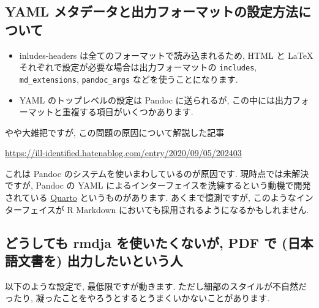 \documentclass[
]{ltjsarticle}
\providecommand{\tightlist}{%
  \setlength{\itemsep}{0pt}\setlength{\parskip}{0pt}}
\begin{document}
\hypertarget{yaml-ux30e1ux30bfux30c7ux30fcux30bfux3068ux51faux529bux30d5ux30a9ux30fcux30deux30c3ux30c8ux306eux8a2dux5b9aux65b9ux6cd5ux306bux3064ux3044ux3066}{%
\subsection{YAML メタデータと出力フォーマットの設定方法について}\label{yaml-ux30e1ux30bfux30c7ux30fcux30bfux3068ux51faux529bux30d5ux30a9ux30fcux30deux30c3ux30c8ux306eux8a2dux5b9aux65b9ux6cd5ux306bux3064ux3044ux3066}}

\begin{itemize}
\tightlist
\item
  inludes-headers は全てのフォーマットで読み込まれるため, HTML と LaTeX それぞれで設定が必要な場合は出力フォーマットの \texttt{includes}, \texttt{md\_extensions}, \texttt{pandoc\_args} などを使うことになります.
\item
  YAML のトップレベルの設定は Pandoc に送られるが, この中には出力フォーマットと重複する項目がいくつかあります.
\end{itemize}

やや大雑把ですが, この問題の原因について解説した記事

\url{https://ill-identified.hatenablog.com/entry/2020/09/05/202403}

これは Pandoc のシステムを使いまわしているのが原因です. 現時点では未解決ですが, Pandoc の YAML によるインターフェイスを洗練するという動機で開発されている \href{https://github.com/quarto-dev/quarto-cli}{Quarto} というものがあります. あくまで憶測ですが, このようなインターフェイスが R Markdown においても採用されるようになるかもしれません.

\hypertarget{ux3069ux3046ux3057ux3066ux3082-rmdja-ux3092ux4f7fux3044ux305fux304fux306aux3044ux304c-pdf-ux3067-ux65e5ux672cux8a9eux6587ux66f8ux3092-ux51faux529bux3057ux305fux3044ux3068ux3044ux3046ux4eba}{%
\subsection{\texorpdfstring{どうしても \textbf{rmdja} を使いたくないが, PDF で (日本語文書を) 出力したいという人}{どうしても rmdja を使いたくないが, PDF で (日本語文書を) 出力したいという人}}\label{ux3069ux3046ux3057ux3066ux3082-rmdja-ux3092ux4f7fux3044ux305fux304fux306aux3044ux304c-pdf-ux3067-ux65e5ux672cux8a9eux6587ux66f8ux3092-ux51faux529bux3057ux305fux3044ux3068ux3044ux3046ux4eba}}

以下のような設定で, 最低限ですが動きます. ただし細部のスタイルが不自然だったり, 凝ったことをやろうとするとうまくいかないことがあります.
\end{document}
